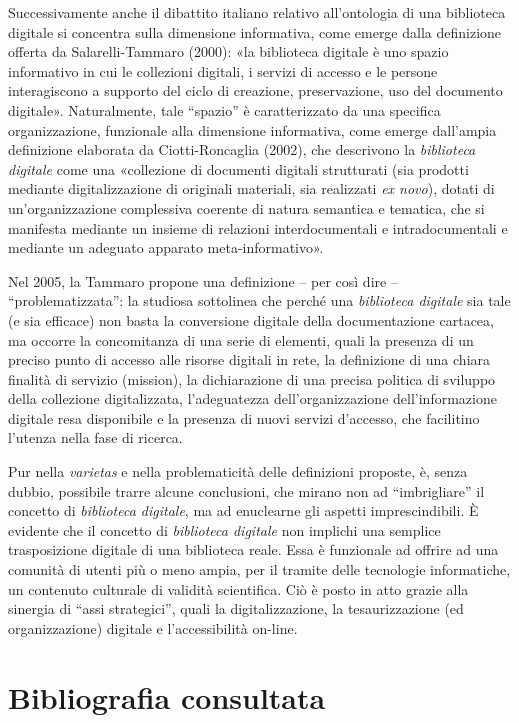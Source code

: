 \documentclass[
  b5paper,
  twoside,
  11pt,
  chapterprefix=false,
  bibliography=totocnumbered,
  listof=flat]{scrbook}
\begin{document}
Successivamente anche il dibattito italiano relativo all'ontologia di
una biblioteca digitale si concentra sulla dimensione informativa, come
emerge dalla definizione offerta da Salarelli-Tammaro (2000): «la
biblioteca digitale è uno spazio informativo in cui le collezioni
digitali, i servizi di accesso e le persone interagiscono a supporto del
ciclo di creazione, preservazione, uso del documento digitale».
Naturalmente, tale \enquote{spazio} è caratterizzato da una specifica
organizzazione, funzionale alla dimensione informativa, come emerge
dall'ampia definizione elaborata da Ciotti-Roncaglia (2002), che
descrivono la \emph{biblioteca digitale} come una «collezione di documenti
digitali strutturati (sia prodotti mediante digitalizzazione di
originali materiali, sia realizzati \emph{ex novo}), dotati di
un'organizzazione complessiva coerente di natura semantica e tematica,
che si manifesta mediante un insieme di relazioni interdocumentali e
intradocumentali e mediante un adeguato apparato meta-informativo».

Nel 2005, la Tammaro propone una definizione -- per così dire --
\enquote{problematizzata}: la studiosa sottolinea che perché una \emph{biblioteca
digitale} sia tale (e sia efficace) non basta la conversione digitale
della documentazione cartacea, ma occorre la concomitanza di una serie
di elementi, quali la presenza di un preciso punto di accesso alle
risorse digitali in rete, la definizione di una chiara finalità di
servizio (mission), la dichiarazione di una precisa politica di sviluppo
della collezione digitalizzata, l'adeguatezza dell'organizzazione
dell'informazione digitale resa disponibile e la presenza di nuovi
servizi d'accesso, che facilitino l'utenza nella fase di ricerca.

Pur nella \emph{varietas} e nella problematicità delle definizioni proposte,
è, senza dubbio, possibile trarre alcune conclusioni, che mirano non ad
\enquote{imbrigliare} il concetto di \emph{biblioteca digitale}, ma ad enuclearne gli
aspetti imprescindibili. È evidente che il concetto di \emph{biblioteca
digitale} non implichi una semplice trasposizione digitale di una
biblioteca reale. Essa è funzionale ad offrire ad una comunità di utenti
più o meno ampia, per il tramite delle tecnologie informatiche, un
contenuto culturale di validità scientifica. Ciò è posto in atto grazie
alla sinergia di \enquote{assi strategici}, quali la digitalizzazione, la
tesaurizzazione (ed organizzazione) digitale e l'accessibilità on-line.

\hypertarget{bibliografia-consultata-3}{%
\section*{Bibliografia consultata}\label{bibliografia-consultata-3}}
\end{document}
